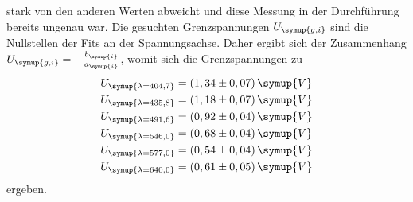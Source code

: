 stark von den anderen Werten abweicht und diese Messung in der Durchführung bereits ungenau war.
Die gesuchten Grenzspannungen $U_{\symup{g, i}}$ sind die Nullstellen der Fits an der Spannungsachse. Daher ergibt sich der Zusammenhang
$U_{\symup{g, i}} = - \frac{b_{\symup{i}}}{a_{\symup{i}}}$, womit sich die Grenzspannungen zu 
\begin{align*}
  U_{\symup{\lambda = 404,7}} &= (1,34 \pm 0,07) \, \symup{V} \\
  U_{\symup{\lambda = 435,8}} &= (1,18 \pm 0,07) \, \symup{V} \\
  U_{\symup{\lambda = 491,6}} &= (0,92 \pm 0,04) \, \symup{V} \\
  U_{\symup{\lambda = 546,0}} &= (0,68 \pm 0,04) \, \symup{V} \\
  U_{\symup{\lambda = 577,0}} &= (0,54 \pm 0,04) \, \symup{V} \\
  U_{\symup{\lambda = 640,0}} &= (0,61 \pm 0,05) \, \symup{V} \\
\end{align*}
ergeben.


